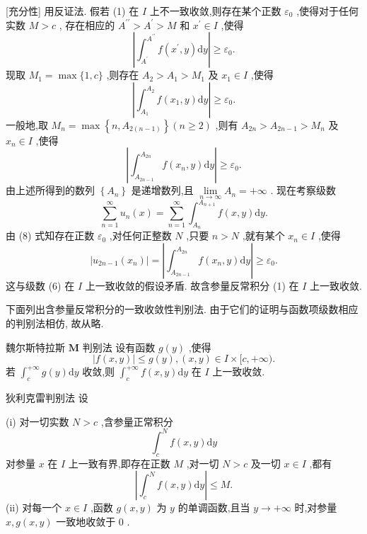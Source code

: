 [充分性] 用反证法. 假若 (1) 在 \(I\) 上不一致收敛,则存在某个正数 \({\varepsilon }_{0}\) ,使得对于任何实数 \(M > c\) , 存在相应的 \({A}^{\prime \prime } > {A}^{\prime } > M\) 和 \({x}^{\prime } \in  I\) ,使得
\[
\left| {{\int }_{{A}^{\prime }}^{{A}^{\prime \prime }}f\left( {{x}^{\prime },y}\right) \mathrm{d}y}\right|  \geq  {\varepsilon }_{0}.
\]
现取 \({M}_{1} = \max \{ 1,c\}\) ,则存在 \({A}_{2} > {A}_{1} > {M}_{1}\) 及 \({x}_{1} \in  I\) ,使得
\[
\left| {{\int }_{{A}_{1}}^{{A}_{2}}f\left( {{x}_{1},y}\right) \mathrm{d}y}\right|  \geq  {\varepsilon }_{0}.
\]
一般地,取 \({M}_{n} = \max \left\{  {n,{A}_{2\left( {n - 1}\right) }}\right\}  \left( {n \geq  2}\right)\) ,则有 \({A}_{2n} > {A}_{{2n} - 1} > {M}_{n}\) 及 \({x}_{n} \in  I\) ,使得
\[
\left| {{\int }_{{A}_{{2n} - 1}}^{{A}_{{2n}}}f\left( {{x}_{n},y}\right) \mathrm{d}y}\right|  \geq  {\varepsilon }_{0}. \tag{8}
\]
由上述所得到的数列 \(\left\{  {A}_{n}\right\}\) 是递增数列,且 \(\mathop{\lim }\limits_{{n \rightarrow  \infty }}{A}_{n} =  + \infty\) . 现在考察级数
\[
\mathop{\sum }\limits_{{n = 1}}^{\infty }{u}_{n}\left( x\right)  = \mathop{\sum }\limits_{{n = 1}}^{\infty }{\int }_{{A}_{n}}^{{A}_{n + 1}}f\left( {x,y}\right) \mathrm{d}y.
\]
由 (8) 式知存在正数 \({\varepsilon }_{0}\) ,对任何正整数 \(N\) ,只要 \(n > N\) ,就有某个 \({x}_{n} \in  I\) ,使得
\[
\left| {{u}_{{2n} - 1}\left( {x}_{n}\right) }\right|  = \left| {{\int }_{{A}_{{2n} - 1}}^{{A}_{2n}}f\left( {{x}_{n},y}\right) \mathrm{d}y}\right|  \geq  {\varepsilon }_{0}.
\]
这与级数 (6) 在 \(I\) 上一致收敛的假设矛盾. 故含参量反常积分 (1) 在 \(I\) 上一致收敛.

下面列出含参量反常积分的一致收敛性判别法. 由于它们的证明与函数项级数相应的判别法相仿, 故从略.

魏尔斯特拉斯 \(\mathbf{M}\) 判别法 设有函数 \(g\left( y\right)\) ,使得
\[
\left| {f\left( {x,y}\right) }\right|  \leq  g\left( y\right) ,\left( {x,y}\right)  \in  I \times  \lbrack c, + \infty ).
\]
若 \({\int }_{c}^{+\infty }g\left( y\right) \mathrm{d}y\) 收敛,则 \({\int }_{c}^{+\infty }f\left( {x,y}\right) \mathrm{d}y\) 在 \(I\) 上一致收敛.

狄利克雷判别法 设

(i) 对一切实数 \(N > c\) ,含参量正常积分
\[
{\int }_{c}^{N}f\left( {x,y}\right) \mathrm{d}y
\]
对参量 \(x\) 在 \(I\) 上一致有界,即存在正数 \(M\) ,对一切 \(N > c\) 及一切 \(x \in  I\) ,都有
\[
\left| {{\int }_{c}^{N}f\left( {x,y}\right) \mathrm{d}y}\right|  \leq  M.
\]
(ii) 对每一个 \(x \in  I\) ,函数 \(g\left( {x,y}\right)\) 为 \(y\) 的单调函数,且当 \(y \rightarrow   + \infty\) 时,对参量 \(x,g\left( {x,y}\right)\) 一致地收敛于 0 .

